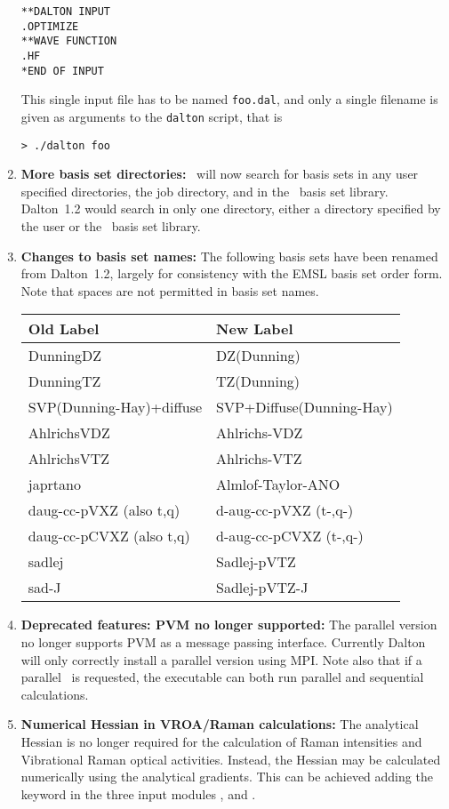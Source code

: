 \begin{enumerate}
\begin{verbatim}
**DALTON INPUT
.OPTIMIZE
**WAVE FUNCTION
.HF
*END OF INPUT
\end{verbatim}
This single input file has to be named \verb|foo.dal|, and only a
single filename is given as arguments to the \verb|dalton| script, that is

\begin{verbatim}
> ./dalton foo
\end{verbatim}

\item{\bf More basis set directories:} \dalton\ will now search for basis sets
in any user specified directories, the job directory, and in the \dalton\ basis
set library. Dalton~1.2 would search in only one directory,
either a directory specified by the user
or the \dalton\ basis set library.

\item{\bf Changes to basis set names:} The following basis sets
have been renamed from Dalton~1.2, largely for consistency with the
EMSL basis set order form. Note that spaces are not
permitted in basis set names.
\begin{center}
\begin{tabular}{|l|l|}\hline
Old Label & New Label \\\hline
DunningDZ & DZ(Dunning)\\
DunningTZ & TZ(Dunning)\\
SVP(Dunning-Hay)+diffuse & SVP+Diffuse(Dunning-Hay) \\
AhlrichsVDZ & Ahlrichs-VDZ \\
AhlrichsVTZ & Ahlrichs-VTZ \\
japrtano & Almlof-Taylor-ANO \\
daug-cc-pVXZ (also t,q) & d-aug-cc-pVXZ (t-,q-)\\
daug-cc-pCVXZ (also t,q) & d-aug-cc-pCVXZ (t-,q-)\\
sadlej & Sadlej-pVTZ \\
sad-J & Sadlej-pVTZ-J \\
\hline
\end{tabular}
\end{center}

\item{\bf Deprecated features: PVM no longer supported:} The parallel
  version no longer supports PVM as a message passing
  interface. Currently Dalton will only correctly install a parallel
  version using MPI. Note also that if a parallel \dalton\ is
  requested, the executable can both run parallel and sequential
  calculations.
%
\item{\bf Numerical Hessian in VROA/Raman calculations:} The
  analytical Hessian is no longer required for the calculation of
  Raman intensities and Vibrational Raman optical activities. Instead,
  the Hessian may be calculated numerically using the analytical
  gradients. This can be achieved adding the keyword  in
  the three input modules ,  and .

\end{enumerate}

